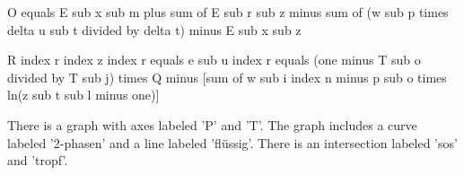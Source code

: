 O equals E sub x sub m plus sum of E sub r sub z minus sum of (w sub p times delta u sub t divided by delta t) minus E sub x sub z

R index r index z index r equals e sub u index r equals (one minus T sub o divided by T sub j) times Q minus [sum of w sub i index n minus p sub o times ln(z sub t sub l minus one)]

There is a graph with axes labeled 'P' and 'T'. The graph includes a curve labeled '2-phasen' and a line labeled 'flüssig'. There is an intersection labeled 'sos' and 'tropf'.